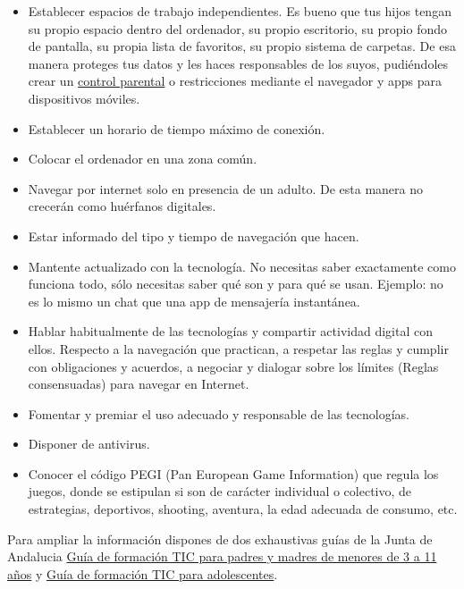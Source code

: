 \documentclass[
  a4paper,
  openany]{book}
\begin{document}
\begin{itemize}
\item
  Establecer espacios de trabajo independientes. Es bueno que tus hijos tengan su propio espacio dentro del ordenador, su propio escritorio, su propio fondo de pantalla, su propia lista de favoritos, su propio sistema de carpetas. De esa manera proteges tus datos y les haces responsables de los suyos, pudiéndoles crear un \href{https://securekids.es/que-es-el-control-parental-y-para-que-sirve/}{control parental} o restricciones mediante el navegador y apps para dispositivos móviles.
\item
  Establecer un horario de tiempo máximo de conexión.
\item
  Colocar el ordenador en una zona común.
\item
  Navegar por internet solo en presencia de un adulto. De esta manera no crecerán como huérfanos digitales.
\item
  Estar informado del tipo y tiempo de navegación que hacen.
\item
  Mantente actualizado con la tecnología. No necesitas saber exactamente como funciona todo, sólo necesitas saber qué son y para qué se usan. Ejemplo: no es lo mismo un chat que una app de mensajería instantánea.
\item
  Hablar habitualmente de las tecnologías y compartir actividad digital con ellos. Respecto a la navegación que practican, a respetar las reglas y cumplir con obligaciones y acuerdos, a negociar y dialogar sobre los límites (Reglas consensuadas) para navegar en Internet.
\item
  Fomentar y premiar el uso adecuado y responsable de las tecnologías.
\item
  Disponer de antivirus.
\item
  Conocer el código PEGI (Pan European Game Information) que regula los juegos, donde se estipulan si son de carácter individual o colectivo, de estrategias, deportivos, shooting, aventura, la edad adecuada de consumo, etc.
\end{itemize}

Para ampliar la información dispones de dos exhaustivas guías de la Junta de Andalucia \href{https://www.andaluciaesdigital.es/documents/20182/28716/Educar+para+Proteger+-+Guía+resumida+de+formación+TIC+para+padres+y+madres+de+niños+de+3+a+11+años.pdf}{Guía de formación TIC para padres y madres de menores de 3 a 11 años} y \href{https://www.juntadeandalucia.es/educacion/portalaverroes/documents/10306/1673096/Educar_para_proteger_Guia_Adolescentes.pdf}{Guía de formación TIC para adolescentes}.
\end{document}
